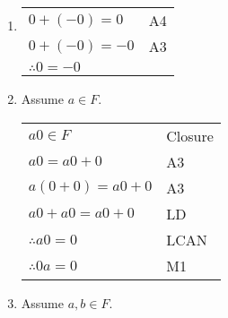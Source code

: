 \documentclass[letterpaper,12pt,fleqn]{article}
\begin{document}
\begin{theproof}
\listbreak
\begin{enumerate}

\item\mbox{}
\listbreak

\begin{tabular}{ll}
$0+(-0)=0$ & A4 \\
$0+(-0)=-0$ & A3 \\
$\therefore 0=-0$ \\
\end{tabular}

\item{Assume $a\in F$.}

\begin{tabular}{ll}
$a0\in F$ & Closure \\
$a0=a0+0$ & A3 \\
$a(0+0)=a0+0$ & A3 \\
$a0+a0=a0+0$ & LD \\
$\therefore a0=0$ & LCAN \\
$\therefore 0a=0$ & M1 \\
\end{tabular}

\item{Assume $a,b\in F$.}
\end{enumerate}
\end{theproof}
\end{document}

